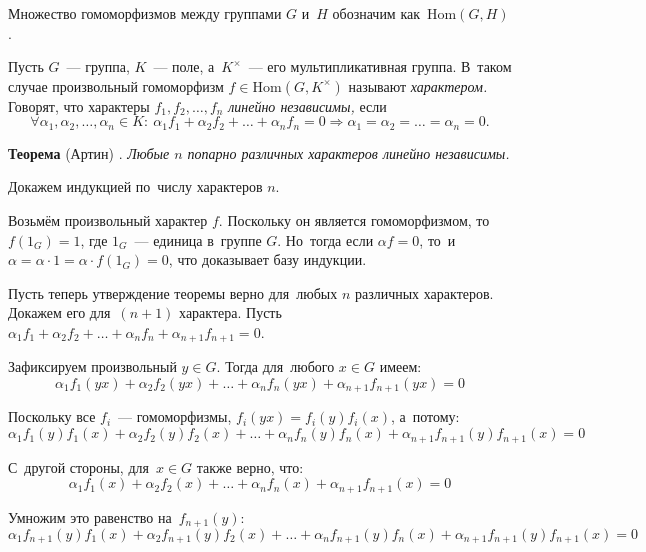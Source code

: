 \documentclass[twoside]{article}
\begin{document}
Множество гомоморфизмов между группами $G$ и~$H$ обозначим как~$\mathrm{Hom}(G, H)$.

Пусть $G$~— группа, $K$~— поле, а~$K^{\times}$~— его мультипликативная группа.
В~таком случае произвольный гомоморфизм $f \in \mathrm{Hom}(G, K^{\times})$ называют \textit{характером.}
Говорят, что характеры $f_1, f_2, \ldots, f_n$ \textit{линейно независимы,}
если
$$
    \forall \alpha_1, \alpha_2, \ldots, \alpha_n \in K{:}\ \alpha_1 f_1 + \alpha_2 f_2 + \ldots + \alpha_n f_n = 0 \Rightarrow \alpha_1 = \alpha_2 = \ldots = \alpha_n = 0.
$$

\noindent\textbf{Теорема} (Артин) \cite{Art48}.\emph{
    Любые $n$ попарно различных характеров линейно независимы.
}\medskip

    Докажем индукцией по~числу характеров $n$.

    Возьмём произвольный характер $f$. Поскольку он является гомоморфизмом,
    то~$f(1_G) = 1$, где $1_G$~— единица в~группе $G$. Но~тогда если $\alpha f = 0$,
    то~и~$\alpha = \alpha \cdot 1 = \alpha \cdot f(1_G) = 0$, что доказывает базу индукции.

    Пусть теперь утверждение теоремы верно для~любых $n$ различных характеров. Докажем его для~$(n + 1)$ характера.
    Пусть $\alpha_1 f_1 + \alpha_2 f_2 + \ldots + \alpha_n f_n + \alpha_{n + 1} f_{n + 1} = 0$.

    Зафиксируем произвольный $y \in G$. Тогда для~любого $x \in G$ имеем:
    \begin{equation}\label{Artin:first}
        \alpha_1 f_1(yx) + \alpha_2 f_2(yx) + \ldots + \alpha_n f_n(yx) + \alpha_{n + 1} f_{n + 1}(yx) = 0
    \end{equation}

    Поскольку все $f_i$~— гомоморфизмы, $f_i(yx) = f_i(y) f_i(x)$, а~потому:
    $$
        \alpha_1 f_1(y) f_1(x) + \alpha_2 f_2(y) f_2(x) + \ldots + \alpha_n f_n(y) f_n(x) + \alpha_{n + 1} f_{n + 1}(y) f_{n + 1}(x) = 0
    $$

    С~другой стороны, для~$x \in G$ также верно, что:
    $$
        \alpha_1 f_1(x) + \alpha_2 f_2(x) + \ldots + \alpha_n f_n(x) + \alpha_{n + 1} f_{n + 1}(x) = 0
    $$

    Умножим это равенство на~$f_{n + 1}(y)$:
    \begin{equation}\label{Artin:second}
        \alpha_1 f_{n + 1}(y) f_1(x) + \alpha_2 f_{n + 1}(y) f_2(x) + \ldots + \alpha_n f_{n + 1}(y) f_n(x) + \alpha_{n + 1} f_{n + 1}(y) f_{n + 1}(x) = 0
    \end{equation}
\end{document}
